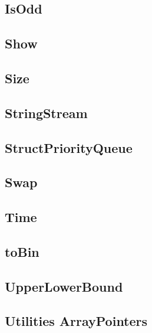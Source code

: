 \subsection{ IsOdd}
\raggedbottom
\hrulefill
\subsection{ Show}
\raggedbottom
\hrulefill
\subsection{ Size}
\raggedbottom
\hrulefill
\subsection{ StringStream}
\raggedbottom
\hrulefill
\subsection{ StructPriorityQueue}
\raggedbottom
\hrulefill
\subsection{ Swap}
\raggedbottom
\hrulefill
\subsection{ Time}
\raggedbottom
\hrulefill
\subsection{ toBin}
\raggedbottom
\hrulefill
\subsection{ UpperLowerBound}
\raggedbottom
\hrulefill
\subsection{Utilities ArrayPointers}
\raggedbottom
\hrulefill
